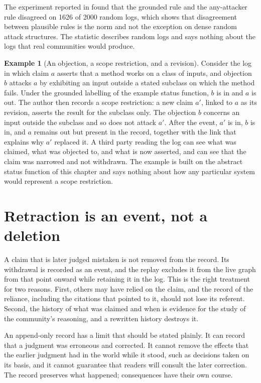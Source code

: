 \documentclass[11pt,twoside,openright]{book}
\theoremstyle{plain}
\theoremstyle{definition}
\newtheorem{example}[theorem]{Example}
\theoremstyle{remark}
\begin{document}
The experiment reported in  found that the grounded rule and the any-attacker rule disagreed on 1626 of 2000 random logs, which shows that disagreement between plausible rules is the norm and not the exception on dense random attack structures. The statistic describes random logs and says nothing about the logs that real communities would produce.

\begin{example}[An objection, a scope restriction, and a revision]
Consider the log in which claim $a$ asserts that a method works on a class of inputs, and objection $b$ attacks $a$ by exhibiting an input outside a stated subclass on which the method fails. Under the grounded labelling of the example status function, $b$ is in and $a$ is out. The author then records a scope restriction: a new claim $a'$, linked to $a$ as its revision, asserts the result for the subclass only. The objection $b$ concerns an input outside the subclass and so does not attack $a'$. After the event, $a'$ is in, $b$ is in, and $a$ remains out but present in the record, together with the link that explains why $a'$ replaced it. A third party reading the log can see what was claimed, what was objected to, and what is now asserted, and can see that the claim was narrowed and not withdrawn. The example is built on the abstract status function of this chapter and says nothing about how any particular system would represent a scope restriction.
\end{example}

\section{Retraction is an event, not a deletion}

A claim that is later judged mistaken is not removed from the record. Its withdrawal is recorded as an event, and the replay excludes it from the live graph from that point onward while retaining it in the log. This is the right treatment for two reasons. First, others may have relied on the claim, and the record of the reliance, including the citations that pointed to it, should not lose its referent. Second, the history of what was claimed and when is evidence for the study of the community's reasoning, and a rewritten history destroys it.

An append-only record has a limit that should be stated plainly. It can record that a judgment was erroneous and corrected. It cannot remove the effects that the earlier judgment had in the world while it stood, such as decisions taken on its basis, and it cannot guarantee that readers will consult the later correction. The record preserves what happened; consequences have their own course.
\end{document}
